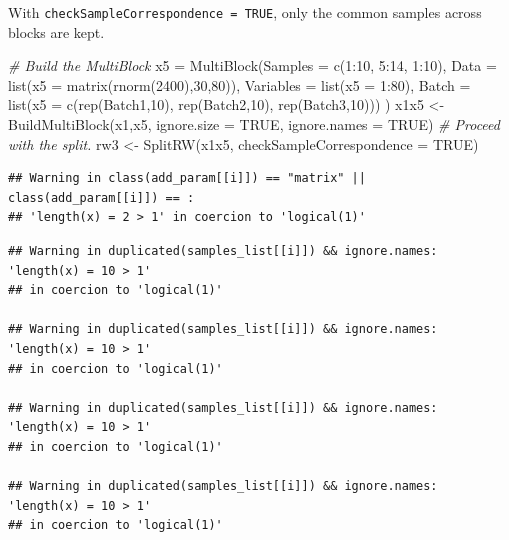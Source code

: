 \documentclass[
]{book}
\newenvironment{Shaded}{\begin{snugshade}}{\end{snugshade}}
\newcommand{\AttributeTok}[1]{\textcolor[rgb]{0.77,0.63,0.00}{#1}}
\newcommand{\CommentTok}[1]{\textcolor[rgb]{0.56,0.35,0.01}{\textit{#1}}}
\newcommand{\ConstantTok}[1]{\textcolor[rgb]{0.00,0.00,0.00}{#1}}
\newcommand{\DecValTok}[1]{\textcolor[rgb]{0.00,0.00,0.81}{#1}}
\newcommand{\FunctionTok}[1]{\textcolor[rgb]{0.00,0.00,0.00}{#1}}
\newcommand{\NormalTok}[1]{#1}
\newcommand{\OtherTok}[1]{\textcolor[rgb]{0.56,0.35,0.01}{#1}}
\newcommand{\SpecialCharTok}[1]{\textcolor[rgb]{0.00,0.00,0.00}{#1}}
\newcommand{\StringTok}[1]{\textcolor[rgb]{0.31,0.60,0.02}{#1}}
\begin{document}
With \texttt{checkSampleCorrespondence\ =\ TRUE}, only the common samples across blocks
are kept.

\begin{Shaded}
\begin{Highlighting}[]
\CommentTok{\# Build the MultiBlock}
\NormalTok{x5 }\OtherTok{=} \FunctionTok{MultiBlock}\NormalTok{(}\AttributeTok{Samples =} \FunctionTok{c}\NormalTok{(}\DecValTok{1}\SpecialCharTok{:}\DecValTok{10}\NormalTok{, }\DecValTok{5}\SpecialCharTok{:}\DecValTok{14}\NormalTok{, }\DecValTok{1}\SpecialCharTok{:}\DecValTok{10}\NormalTok{),}
                \AttributeTok{Data =} \FunctionTok{list}\NormalTok{(}\AttributeTok{x5 =} \FunctionTok{matrix}\NormalTok{(}\FunctionTok{rnorm}\NormalTok{(}\DecValTok{2400}\NormalTok{),}\DecValTok{30}\NormalTok{,}\DecValTok{80}\NormalTok{)),}
                \AttributeTok{Variables =} \FunctionTok{list}\NormalTok{(}\AttributeTok{x5 =} \DecValTok{1}\SpecialCharTok{:}\DecValTok{80}\NormalTok{),}
                \AttributeTok{Batch =} \FunctionTok{list}\NormalTok{(}\AttributeTok{x5 =} \FunctionTok{c}\NormalTok{(}\FunctionTok{rep}\NormalTok{(}\StringTok{\textquotesingle{}Batch1\textquotesingle{}}\NormalTok{,}\DecValTok{10}\NormalTok{),}
                                    \FunctionTok{rep}\NormalTok{(}\StringTok{\textquotesingle{}Batch2\textquotesingle{}}\NormalTok{,}\DecValTok{10}\NormalTok{),}
                                    \FunctionTok{rep}\NormalTok{(}\StringTok{\textquotesingle{}Batch3\textquotesingle{}}\NormalTok{,}\DecValTok{10}\NormalTok{)))}
\NormalTok{)}
\NormalTok{x1x5 }\OtherTok{\textless{}{-}} \FunctionTok{BuildMultiBlock}\NormalTok{(x1,x5, }\AttributeTok{ignore.size =} \ConstantTok{TRUE}\NormalTok{, }\AttributeTok{ignore.names =} \ConstantTok{TRUE}\NormalTok{)}
\CommentTok{\# Proceed with the split.}
\NormalTok{rw3 }\OtherTok{\textless{}{-}} \FunctionTok{SplitRW}\NormalTok{(x1x5, }\AttributeTok{checkSampleCorrespondence =} \ConstantTok{TRUE}\NormalTok{)}
\end{Highlighting}
\end{Shaded}

\begin{verbatim}
## Warning in class(add_param[[i]]) == "matrix" || class(add_param[[i]]) == :
## 'length(x) = 2 > 1' in coercion to 'logical(1)'
\end{verbatim}

\begin{verbatim}
## Warning in duplicated(samples_list[[i]]) && ignore.names: 'length(x) = 10 > 1'
## in coercion to 'logical(1)'

## Warning in duplicated(samples_list[[i]]) && ignore.names: 'length(x) = 10 > 1'
## in coercion to 'logical(1)'

## Warning in duplicated(samples_list[[i]]) && ignore.names: 'length(x) = 10 > 1'
## in coercion to 'logical(1)'

## Warning in duplicated(samples_list[[i]]) && ignore.names: 'length(x) = 10 > 1'
## in coercion to 'logical(1)'
\end{verbatim}
\end{document}
